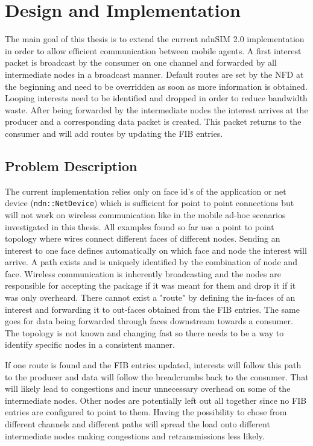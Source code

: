 \chapter{Design and Implementation}

The main goal of this thesis is to extend the current ndnSIM 2.0 implementation in order to allow efficient communication between mobile agents. A first interest packet is broadcast by the consumer on one channel and forwarded by all intermediate nodes in a broadcast manner. Default routes are set by the NFD at the beginning and need to be overridden as soon as more information is obtained. Looping interests need to be identified and dropped in order to reduce bandwidth waste. After being forwarded by the intermediate nodes the interest arrives at the producer and a corresponding data packet is created. This packet returns to the consumer and will add routes by updating the FIB entries.

\section{Problem Description}

The current implementation relies only on face id's of the application or net device (\texttt{ndn::NetDevice}) which is sufficient for point to point connections but will not work on wireless communication like in the mobile ad-hoc scenarios investigated in this thesis. All examples found so far use a point to point topology where wires connect different faces of different nodes. Sending an interest to one face defines automatically on which face and node the interest will arrive. A path exists and is uniquely identified by the combination of node and face. Wireless communication is inherently broadcasting and the nodes are responsible for accepting the package if it was meant for them and drop it if it was only overheard. There cannot exist a "route" by defining the in-faces of an interest and forwarding it to out-faces obtained from the FIB entries. The same goes for data being forwarded through faces downstream towards a consumer. The topology is not known and changing fast so there needs to be a way to identify specific nodes in a consistent manner.

If one route is found and the FIB entries updated, interests will follow this path to the producer and data will follow the breadcrumbs back to the consumer. That will likely lead to congestions and incur unnecessary overhead on some of the intermediate nodes. Other nodes are potentially left out all together since no FIB entries are configured to point to them. Having the possibility to chose from different channels and different paths will spread the load onto different intermediate nodes making congestions and retransmissions less likely.

